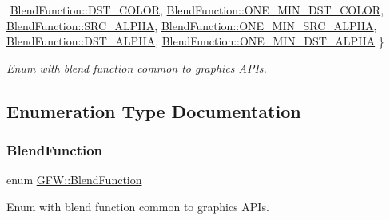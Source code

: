 \begin{DoxyCompactItemize}
$$\newline
\hyperlink{namespace_g_f_w_ac19434e926d01e02140f07e74ff36f3ca220e8b21c17d3d0f297244647d60df59}{Blend\+Function\+::\+D\+S\+T\+\_\+\+C\+O\+L\+OR}, 
\hyperlink{namespace_g_f_w_ac19434e926d01e02140f07e74ff36f3cad4d92f5c84984342634260a4b5fd393b}{Blend\+Function\+::\+O\+N\+E\+\_\+\+M\+I\+N\+\_\+\+D\+S\+T\+\_\+\+C\+O\+L\+OR}, 
\hyperlink{namespace_g_f_w_ac19434e926d01e02140f07e74ff36f3caa01be6519d4fb614f16261a59958bbb4}{Blend\+Function\+::\+S\+R\+C\+\_\+\+A\+L\+P\+HA}, 
\hyperlink{namespace_g_f_w_ac19434e926d01e02140f07e74ff36f3ca08026c96cd02fba552125a5e7abb6e77}{Blend\+Function\+::\+O\+N\+E\+\_\+\+M\+I\+N\+\_\+\+S\+R\+C\+\_\+\+A\+L\+P\+HA}, 
\newline
\hyperlink{namespace_g_f_w_ac19434e926d01e02140f07e74ff36f3ca59b7e4d8d77a6fc488bfad5dfb160ecc}{Blend\+Function\+::\+D\+S\+T\+\_\+\+A\+L\+P\+HA}, 
\hyperlink{namespace_g_f_w_ac19434e926d01e02140f07e74ff36f3ca86015ab1ea27c303a41042578a9536c0}{Blend\+Function\+::\+O\+N\+E\+\_\+\+M\+I\+N\+\_\+\+D\+S\+T\+\_\+\+A\+L\+P\+HA}
 \}\begin{DoxyCompactList}\small\item\em Enum with blend function common to graphics A\+P\+Is. \end{DoxyCompactList}
\end{DoxyCompactItemize}


\subsection{Enumeration Type Documentation}
\mbox{\label{namespace_g_f_w_ac19434e926d01e02140f07e74ff36f3c}} 
\subsubsection{\texorpdfstring{Blend\+Function}{BlendFunction}}
{\footnotesize\ttfamily enum \hyperlink{namespace_g_f_w_ac19434e926d01e02140f07e74ff36f3c}{G\+F\+W\+::\+Blend\+Function}\hspace{0.3cm}{\ttfamily [strong]}}



Enum with blend function common to graphics A\+P\+Is. 

